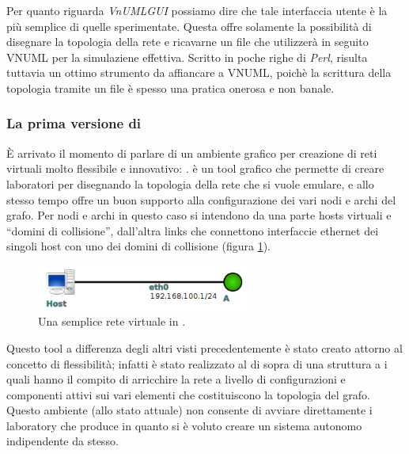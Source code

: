 Per quanto riguarda \emph{VnUMLGUI} possiamo dire che tale interfaccia utente è la più semplice di quelle sperimentate. Questa offre solamente la possibilità di disegnare la topologia della rete e ricavarne un file \xml che utilizzerà in seguito VNUML per la simulaziene effettiva. Scritto in poche righe di \emph{Perl}, risulta tuttavia un ottimo strumento da affiancare a VNUML, poichè la scrittura della topologia tramite un file \xml è spesso una pratica onerosa e non banale.

\subsubsection{La prima versione di \visualnetkit{}}
È arrivato il momento di parlare di un ambiente grafico per creazione di reti virtuali molto flessibile e innovativo: \visualnetkit{}. \visualnetkit{} è un tool grafico che permette di creare laboratori per \netkit{} disegnando la topologia della rete che si vuole emulare, e allo stesso tempo offre un buon supporto alla configurazione dei vari nodi e archi del grafo. Per nodi e archi in questo caso si intendono da una parte hosts virtuali e ``domini di collisione'', dall'altra links che connettono interfaccie ethernet dei singoli host con uno dei domini di collisione (figura \ref{figura:vn_graph_1}).

\begin{figure}[!ht]
	\centering
	\includegraphics[width=7cm]{images/visualnetkit_graph_1.png}
	\caption{Una semplice rete virtuale in \visualnetkit{}.}
	\label{figura:vn_graph_1}
\end{figure}

Questo tool a differenza degli altri visti precedentemente è stato creato attorno al concetto di flessibilità; infatti \visualnetkit è stato realizzato al di sopra di una struttura a \plugin{} i quali hanno il compito di arricchire la rete a livello di configurazioni e componenti attivi sui vari elementi che costituiscono la topologia del grafo. Questo ambiente (allo stato attuale) non consente di avviare direttamente i laboratory che produce in quanto si è voluto creare un sistema autonomo indipendente da \netkit{} stesso.

